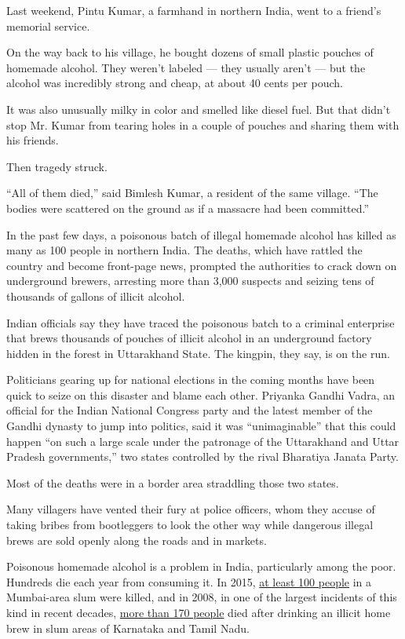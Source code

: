 Last weekend, Pintu Kumar, a farmhand in northern India, went to a
friend's memorial service.

On the way back to his village, he bought dozens of small plastic
pouches of homemade alcohol. They weren't labeled --- they usually
aren't --- but the alcohol was incredibly strong and cheap, at about 40
cents per pouch.

It was also unusually milky in color and smelled like diesel fuel. But
that didn't stop Mr. Kumar from tearing holes in a couple of pouches and
sharing them with his friends.

Then tragedy struck.

``All of them died,'' said Bimlesh Kumar, a resident of the same
village. ``The bodies were scattered on the ground as if a massacre had
been committed.''

In the past few days, a poisonous batch of illegal homemade alcohol has
killed as many as 100 people in northern India. The deaths, which have
rattled the country and become front-page news, prompted the authorities
to crack down on underground brewers, arresting more than 3,000 suspects
and seizing tens of thousands of gallons of illicit alcohol.

Indian officials say they have traced the poisonous batch to a criminal
enterprise that brews thousands of pouches of illicit alcohol in an
underground factory hidden in the forest in Uttarakhand State. The
kingpin, they say, is on the run.

Politicians gearing up for national elections in the coming months have
been quick to seize on this disaster and blame each other. Priyanka
Gandhi Vadra, an official for the Indian National Congress party and the
latest member of the Gandhi dynasty to jump into politics, said it was
``unimaginable'' that this could happen ``on such a large scale under
the patronage of the Uttarakhand and Uttar Pradesh governments,'' two
states controlled by the rival Bharatiya Janata Party.

Most of the deaths were in a border area straddling those two states.

Many villagers have vented their fury at police officers, whom they
accuse of taking bribes from bootleggers to look the other way while
dangerous illegal brews are sold openly along the roads and in markets.

Poisonous homemade alcohol is a problem in India, particularly among the
poor. Hundreds die each year from consuming it. In 2015,
\href{https://www.bbc.com/news/world-asia-india-33224514}{at least 100
people} in a Mumbai-area slum were killed, and in 2008, in one of the
largest incidents of this kind in recent decades,
\href{https://timesofindia.indiatimes.com/city/chennai/TN-hooch-tragedy-21-cops-suspended/articleshow/3159848.cms?referral=PM}{more
than 170 people} died after drinking an illicit home brew in slum areas
of Karnataka and Tamil Nadu.

